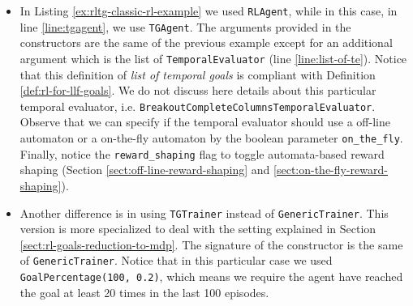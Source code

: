 \begin{itemize}
	\item In Listing \ref{ex:rltg-classic-rl-example} we used \texttt{RLAgent}, while in this case, in line \ref{line:tgagent}, we use \texttt{TGAgent}. The arguments provided in the constructors are the same of the previous example except for an additional argument which is the list of \texttt{TemporalEvaluator} (line \ref{line:list-of-te}). Notice that this definition of \emph{list of temporal goals} is compliant with Definition \ref{def:rl-for-llf-goals}. We do not discuss here details about this particular temporal evaluator, i.e. \texttt{BreakoutCompleteColumnsTemporalEvaluator}. Observe that we can specify if the temporal evaluator should use a off-line automaton or a on-the-fly automaton by the boolean parameter \texttt{on\_the\_fly}. Finally, notice the \texttt{reward\_shaping} flag to toggle automata-based reward shaping (Section \ref{sect:off-line-reward-shaping} and \ref{sect:on-the-fly-reward-shaping}).
	\item Another difference is in using \texttt{TGTrainer} instead of \texttt{GenericTrainer}. This version is more specialized to deal with the setting explained in Section \ref{sect:rl-goals-reduction-to-mdp}. The signature of the constructor is the same of \texttt{GenericTrainer}. Notice that in this particular case we used \texttt{GoalPercentage(100, 0.2)}, which means we require the agent have reached the goal at least 20 times in the last 100 episodes.
\end{itemize}
